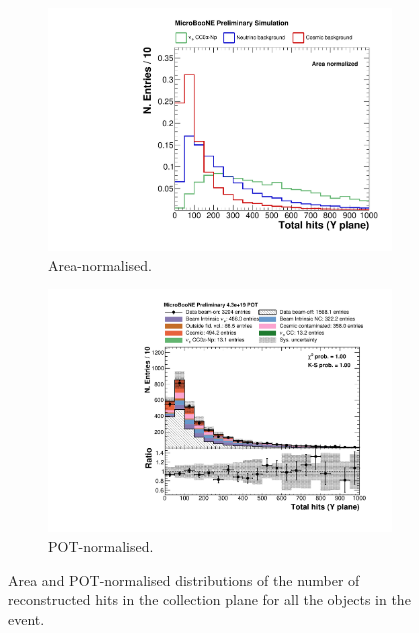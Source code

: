 \begin{figure}[htbp]
\centering
  \begin{subfigure}{0.49\textwidth}
    \includegraphics[width=\linewidth]{figures/h_total_hits_y_norm.pdf}
    \caption{Area-normalised.} \label{fig:nhits_integral}
  \end{subfigure}
    \begin{subfigure}{0.49\textwidth}
    \includegraphics[width=\linewidth]{figures/h_total_hits_y.pdf}
    \caption{POT-normalised.} \label{fig:nhits_pot}
  \end{subfigure}
  \caption{Area and POT-normalised distributions of the number of reconstructed hits in the collection plane for all the objects in the event.}
\end{figure}


